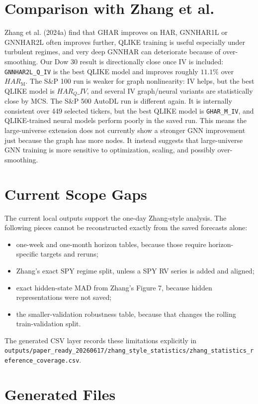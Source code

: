 \documentclass[11pt,a4paper]{article}
\begin{document}
\section{Comparison with Zhang et al.}

Zhang et al. (2024a) find that GHAR improves on HAR, GNNHAR1L or GNNHAR2L often improves further,
QLIKE training is useful especially under turbulent regimes, and very deep GNNHAR can deteriorate
because of over-smoothing.  Our Dow 30 result is directionally close once IV is included:
\texttt{GNNHAR2L\_Q\_IV} is the best QLIKE model and improves roughly \(11.1\%\) over \(HAR_{\mathrm{M}}\).
The S\&P 100 run is weaker for graph nonlinearity: IV helps, but the best QLIKE model is
\(HAR_Q\_IV\), and several IV graph/neural variants are statistically close by MCS.
The S\&P 500 AutoDL run is different again.  It is internally consistent over 449 selected
tickers, but the best QLIKE model is \texttt{GHAR\_M\_IV}, and QLIKE-trained neural models perform
poorly in the saved run.  This means the large-universe extension does not currently show a
stronger GNN improvement just because the graph has more nodes.  It instead suggests that
large-universe GNN training is more sensitive to optimization, scaling, and possibly over-smoothing.


\section{Current Scope Gaps}

The current local outputs support the one-day Zhang-style analysis.  The following pieces
cannot be reconstructed exactly from the saved forecasts alone:
\begin{itemize}
\item one-week and one-month horizon tables, because those require horizon-specific targets and reruns;
\item Zhang's exact SPY regime split, unless a SPY RV series is added and aligned;
\item exact hidden-state MAD from Zhang's Figure 7, because hidden representations were not saved;
\item the smaller-validation robustness table, because that changes the rolling train-validation split.
\end{itemize}
The generated CSV layer records these limitations explicitly in
\texttt{outputs/paper\_ready\_20260617/zhang\_style\_statistics/zhang\_statistics\_reference\_coverage.csv}.


\section{Generated Files}
\end{document}
